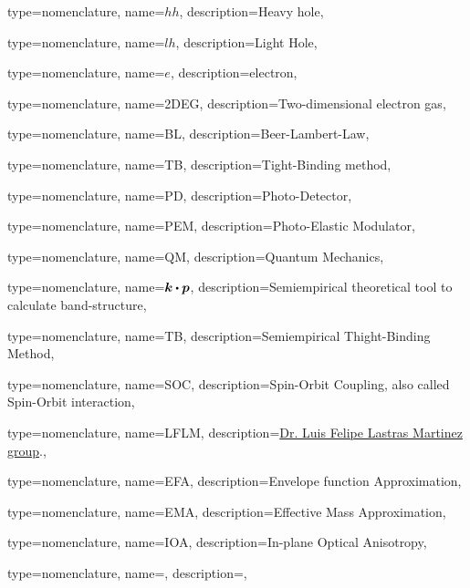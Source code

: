 {type={nomenclature},
name={\ensuremath{hh}},
description={Heavy hole},
}


{type={nomenclature},
name={\ensuremath{lh}},
description={Light Hole},
}

{type={nomenclature},
name={\ensuremath{e}},
description={electron},
}

{type={nomenclature},
name={2DEG},
description={Two-dimensional electron gas},
}

{type={nomenclature},
name={BL},
description={Beer-Lambert-Law},
}

{type={nomenclature},
name={TB},
description={Tight-Binding method},
}

{type={nomenclature},
name={PD},
description={Photo-Detector},
}

{type={nomenclature},
name={PEM},
description={Photo-Elastic Modulator},
}

{type={nomenclature},
name={QM},
description={Quantum Mechanics},
}

{type={nomenclature},
name={$\boldsymbol{k}\bigcdot \boldsymbol{p}$},
description={Semiempirical theoretical tool to calculate band-structure},
}


{type={nomenclature},
name={TB},
description={Semiempirical Thight-Binding Method},
}


{type={nomenclature},
name={SOC},
description={Spin-Orbit Coupling, also called Spin-Orbit interaction},
}

{type={nomenclature},
name={LFLM},
description={\href{https://github.com/lflm-spectra-labs-iico}{Dr. Luis Felipe Lastras Martinez group}.},
}

{type={nomenclature},
name={EFA},
description={Envelope function Approximation},
}

{type={nomenclature},
name={EMA},
description={Effective Mass Approximation},
}


{type={nomenclature},
name={IOA},
description={In-plane Optical Anisotropy},
}




\newglossaryentry{}
{type={nomenclature},
name={},
description={},
}



\renewcommand{\glsnamefont}[1]{\textcolor{black}{\textbf{#1}}}
\printunsrtglossary[type=nomenclature,style=long3col]
\printunsrtglossary[type=abbreviations,title={List of codes and packages}]
\printunsrtglossary[type=symbols,]

